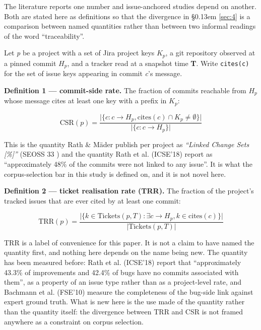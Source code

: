 \documentclass[11pt,a4paper]{article}
\begin{document}
The literature reports one number and issue-anchored studies depend on another. Both are stated here as definitions so that the divergence in \S\kern0.13em \ref{sec:4} is a comparison between named quantities rather than between two informal readings of the word ``traceability''.

Let \emph{p} be a project with a set of Jira project keys \textbf{$K_p$}, a git repository observed at a pinned commit \textbf{$H_p$}, and a tracker read at a snapshot time \textbf{T}. Write \texttt{cites(c)} for the set of issue keys appearing in commit \emph{c}'s message.

\textbf{Definition 1 --- commit-side rate.} The fraction of commits reachable from $H_p$ whose message cites at least one key with a prefix in $K_p$:

\[\mathrm{CSR}(p) = \frac{\bigl\lvert\{ c : c \longrightarrow H_p, \mathrm{cites}(c) \cap K_p \neq \emptyset \}\bigr\rvert}{\bigl\lvert\{ c : c \longrightarrow H_p \}\bigr\rvert}\]

This is the quantity Rath \& M\"ader publish per project as \emph{``Linked Change Sets [\%]''} (SEOSS 33 \cite{rath2019seoss}) and the quantity Rath et al. (ICSE'18) \cite{rath2018traceability} report as ``approximately 48\% of the commits were not linked to any issue''. It is what the corpus-selection bar in this study is defined on, and it is not novel here.

\textbf{Definition 2 --- ticket realisation rate (TRR).} The fraction of the project's tracked issues that are ever cited by at least one commit:

\[\mathrm{TRR}(p) = \frac{\bigl\lvert\{ k \in \mathrm{Tickets}(p, T) : \exists c \longrightarrow H_p, k \in \mathrm{cites}(c) \}\bigr\rvert}{\lvert \mathrm{Tickets}(p, T)\rvert}\]

TRR is a label of convenience for this paper. It is not a claim to have named the quantity first, and nothing here depends on the name being new. The quantity has been measured before: Rath et al. (ICSE'18) \cite{rath2018traceability} report that ``approximately 43.3\% of improvements and 42.4\% of bugs have no commits associated with them'', as a property of an issue type rather than as a project-level rate, and Bachmann et al. (FSE'10) \cite{bachmann2010missing} measure the completeness of the bug-side link against expert ground truth. What is new here is the use made of the quantity rather than the quantity itself: the divergence between TRR and CSR is not framed anywhere as a constraint on corpus selection.
\end{document}
